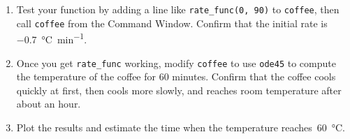 \documentclass[../../book.tex]{subfiles}
\begin{document}
\begin{ex}
\begin{enumerate}
\item Test your function by adding a line like \lstinline{rate_func(0, 90)}
to \lstinline{coffee}, then call \lstinline{coffee} from the Command Window.
Confirm that the initial rate is \SI{-0.7}{\celsius \per \minute}.

\item Once you get \lstinline{rate_func} working, modify
\lstinline{coffee} to use \lstinline{ode45} to compute the temperature
of the coffee for 60 minutes.  Confirm that
the coffee cools quickly at first, then cools more slowly, and reaches
room temperature after about an hour.

\item Plot the results and estimate the time when the temperature reaches~\SI{60}{\celsius}.

\end{enumerate}

\end{ex}
\end{document}
